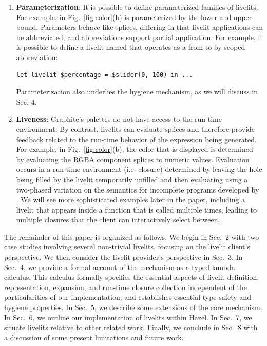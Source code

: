 \begin{enumerate}
  \item \textbf{Parameterization}: It is possible to define parameterized families of livelits. 
  For example,  in Fig.~\ref{fig:color}(b) is parameterized by the lower and upper bound. 
  Parameters behave like splices, differing in that livelit applications can be abbreviated, and abbreviations
  support partial application. For example, it is possible to define a livelit named  
  that operates as a  from  to  by scoped abbreviation:
  \begin{lstlisting}[numbers=none]
  let livelit $percentage = $slider(0, 100) in ...
  \end{lstlisting}
  Parameterization also underlies the hygiene mechanism, as we will discuss in Sec. 4.

  \item \textbf{Liveness}: Graphite's palettes do not have 
  access to the run-time environment. By contrast, livelits can evaluate splices
  and therefore provide feedback related to the run-time behavior of the expression being generated. 
  For example, in Fig.~\ref{fig:color}(b), the color that is displayed is determined by evaluating the RGBA 
  component splices to numeric values.
  Evaluation occurs in a run-time environment (i.e. closure) determined by 
  leaving the hole being filled by the livelit temporarily unfilled and then evaluating
  using a two-phased variation on the semantics for incomplete programs developed by \citet{HazelnutLive}. 
  We will see more sophisticated examples later in the paper, including a livelit 
  that appears inside a function that is called multiple times, leading to multiple closures that the client can 
  interactively select between.
\end{enumerate}

The remainder of this paper is organized as follows. We begin in Sec.~2 with two case studies 
involving several non-trivial livelits, focusing on the livelit client's perspective. 
We then consider the livelit provider's perspective in Sec.~3.
In Sec.~4, we provide a formal account of the mechanism as a typed lambda calculus. 
This calculus formally specifies the essential aspects of livelit definition, representation, expansion, 
and run-time closure collection independent of the particularities of our implementation, 
and establishes essential type safety and hygiene properties. 
In Sec.~5, we describe some extensions of the core mechanism.
In Sec.~6, we outline our implementation of livelits within Hazel.
In Sec.~7, we situate livelits relative to other related work. 
Finally, we conclude in Sec.~8 with a discussion of some present limitations and future work.
